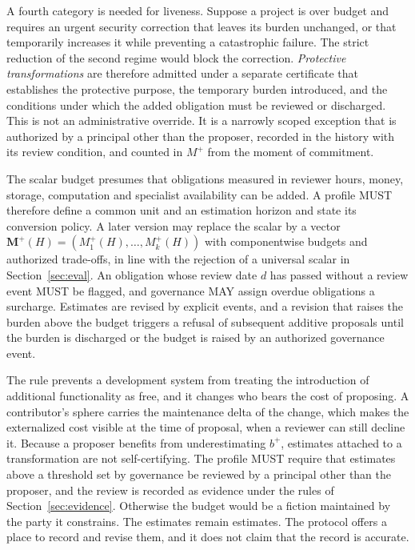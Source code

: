 \documentclass[11pt]{article}
\theoremstyle{remark}
\begin{document}
A fourth category is needed for liveness. Suppose a project is over budget and requires an urgent security correction that leaves its burden unchanged, or that temporarily increases it while preventing a catastrophic failure. The strict reduction of the second regime would block the correction. \emph{Protective transformations} are therefore admitted under a separate certificate that establishes the protective purpose, the temporary burden introduced, and the conditions under which the added obligation must be reviewed or discharged. This is not an administrative override. It is a narrowly scoped exception that is authorized by a principal other than the proposer, recorded in the history with its review condition, and counted in $M^{+}$ from the moment of commitment.

The scalar budget presumes that obligations measured in reviewer hours, money, storage, computation and specialist availability can be added. A profile MUST therefore define a common unit and an estimation horizon and state its conversion policy. A later version may replace the scalar by a vector $\mathbf M^{+}(H)=(M_1^{+}(H),\dots,M_k^{+}(H))$ with componentwise budgets and authorized trade-offs, in line with the rejection of a universal scalar in Section~\ref{sec:eval}. An obligation whose review date $d$ has passed without a review event MUST be flagged, and governance MAY assign overdue obligations a surcharge. Estimates are revised by explicit events, and a revision that raises the burden above the budget triggers a refusal of subsequent additive proposals until the burden is discharged or the budget is raised by an authorized governance event.

The rule prevents a development system from treating the introduction of additional functionality as free, and it changes who bears the cost of proposing. A contributor's sphere carries the maintenance delta of the change, which makes the externalized cost visible at the time of proposal, when a reviewer can still decline it. Because a proposer benefits from underestimating $b^{+}$, estimates attached to a transformation are not self-certifying. The profile MUST require that estimates above a threshold set by governance be reviewed by a principal other than the proposer, and the review is recorded as evidence under the rules of Section~\ref{sec:evidence}. Otherwise the budget would be a fiction maintained by the party it constrains. The estimates remain estimates. The protocol offers a place to record and revise them, and it does not claim that the record is accurate.
\end{document}
